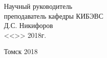\begin{titlepage}
\vfill

\begin{flushright}
\begin{minipage}{0.45\textwidth}
 \begin{flushleft}
Научный руководитель\\
преподаватель кафедры КИБЭВС\\
\underline{\hspace{3cm}} Д.С. Никифоров\\
<<\underline{\hspace{1cm}}>>\underline{\hspace{3cm}} 2018г.\\
 \end{flushleft}
\end{minipage}
\end{flushright}

\vfill

\centerline{Томск 2018}
\end{titlepage}
\clearpage
